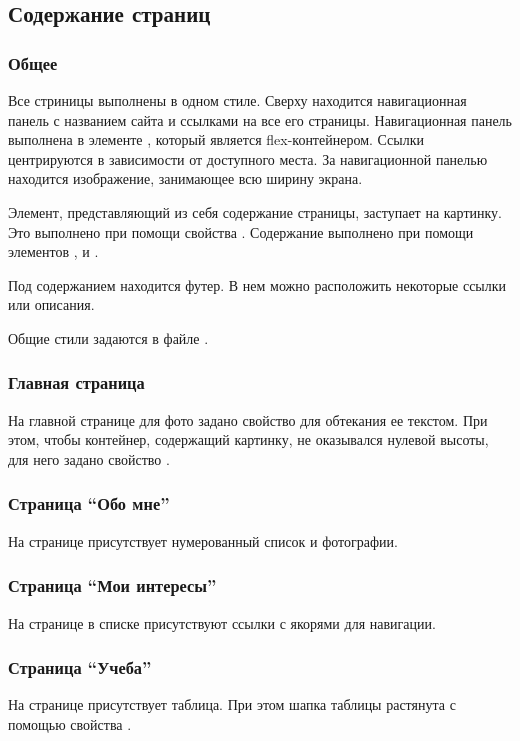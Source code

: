 \documentclass[a4paper,14pt]{extarticle}
\begin{document}
\subsection{Содержание страниц}
\subsubsection{Общее}
Все стриницы выполнены в одном стиле. Сверху находится
навигационная панель с названием сайта и ссылками на
все его страницы. Навигационная панель выполнена в
элементе , который является flex-контейнером.
Ссылки центрируются в зависимости от доступного места.
За навигационной панелью находится изображение, занимающее
всю ширину экрана.

Элемент, представляющий из себя содержание страницы, заступает
на картинку. Это выполнено при помощи свойства .
Содержание выполнено при помощи элементов ,
 и .

Под содержанием находится футер. В нем можно расположить
некоторые ссылки или описания.

Общие стили задаются в файле .

\subsubsection{Главная страница}
На главной странице для фото задано свойство 
для обтекания ее текстом. При этом, чтобы контейнер, содержащий
картинку, не оказывался нулевой высоты, для него задано свойство
.

\subsubsection{Страница \enquote{Обо мне}}
На странице присутствует нумерованный список и фотографии.

\subsubsection{Страница \enquote{Мои интересы}}
На странице в списке присутствуют ссылки с якорями для навигации.

\subsubsection{Страница \enquote{Учеба}}
На странице присутствует таблица. При этом шапка таблицы растянута
с помощью свойства .
\end{document}
